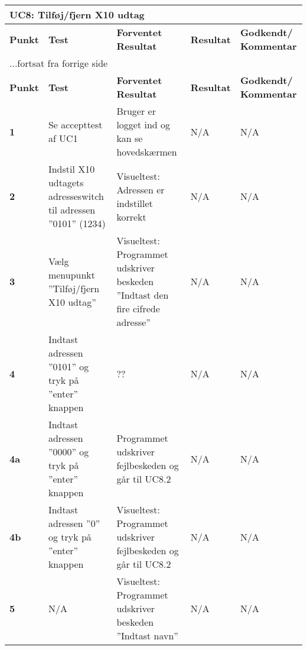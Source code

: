 
\begin{center}
\begin{longtable}{|p{}|p{}|p{3cm}|p{3cm}|p{3cm}|} %
\hline
\multicolumn{5}{|l|}{\textbf{UC8: Tilføj/fjern X10 udtag}} \\ \hline
\textbf{Punkt} &
\textbf{Test} &
\textbf{Forventet \newline Resultat} &
\textbf{Resultat} &
\textbf{Godkendt/ \newline Kommentar} \\ \hline 
\endfirsthead

\multicolumn{5}{l}{...fortsat fra forrige side} \\ \hline 
\textbf{Punkt} &
\textbf{Test} &
\textbf{Forventet \newline Resultat} &
\textbf{Resultat} &
\textbf{Godkendt/ \newline Kommentar} \\ \hline 
\endhead


\textbf{1} &
Se accepttest af UC1 &
Bruger er logget ind og kan se hovedskærmen &
N/A &
N/A \\\hline

\textbf{2} &
Indstil X10 udtagets adresseswitch til adressen ''0101'' (1234) &
Visueltest: Adressen er indstillet korrekt &
N/A &
N/A \\\hline

\textbf{3} &
Vælg menupunkt ''Tilføj/fjern X10 udtag'' &
Visueltest: Programmet udskriver beskeden ''Indtast den fire cifrede adresse'' &
N/A &
N/A \\\hline

\textbf{4} &
Indtast adressen ''0101'' og tryk på ''enter'' knappen &
?? &
N/A &
N/A \\\hline

\textbf{4a} &
Indtast adressen ''0000'' og tryk på ''enter'' knappen &
Programmet udskriver fejlbeskeden og går til UC8.2 &
N/A &
N/A \\\hline

\textbf{4b} &
Indtast adressen ''0'' og tryk på ''enter'' knappen &
Visueltest: Programmet udskriver fejlbeskeden og går til UC8.2 &
N/A &
N/A \\\hline

\textbf{5} &
N/A &
Visueltest: Programmet udskriver beskeden ''Indtast navn''&
N/A &
N/A \\\hline


\end{longtable}
\end{center}
